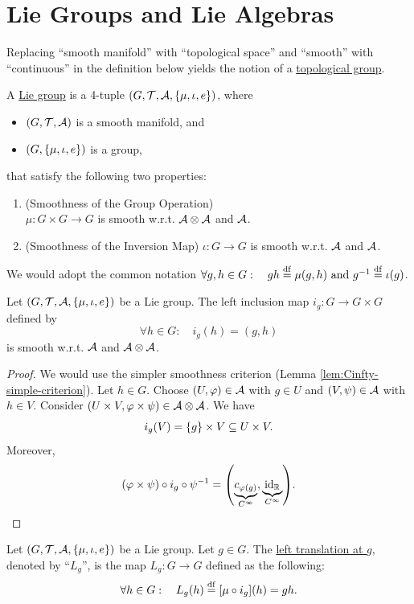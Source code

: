\documentclass[11pt,reqno]{amsart}
\renewcommand{\phi}{\varphi}
\begin{document}
\section{Lie Groups and Lie Algebras}
\begin{remark}
Replacing ``smooth manifold'' with ``topological space'' and ``smooth'' with ``continuous'' in the definition below yields the notion of a \ul{topological group}.
\end{remark}

\begin{Def}
A \ul{Lie group} is a 4-tuple $(G,\T,\A,\set{\mu,\iota,e})$, where
\begin{itemize}
\item $(G,\mathcal{T},\mathcal{A})$ is a smooth manifold, and
\item $(G,\set{\mu,\iota,e})$ is a group,
\end{itemize}
that satisfy the following two properties:
\begin{enumerate}
\item (Smoothness of the Group Operation)\\
$\mu:G\times G\to G$ is smooth w.r.t.
$\mathcal{A}\otimes\mathcal{A}$ and $\mathcal{A}$.
\item (Smoothness of the Inversion Map)
$\iota:G\to G$ is smooth w.r.t. $\mathcal{A}$ and $\mathcal{A}$.
\end{enumerate}
We would adopt the common notation $
\forall g,h\in G:\quad gh\stackrel{\mathrm{df}}{=}\mu(g,h)~\mathrm{and}~ g^{-1}\stackrel{\mathrm{df}}{=}\iota(g)$.
\end{Def}

\begin{lemma}\label{lem:left-inclusion-Cinfty}
Let $(G,\T,\A,\set{\mu,\iota,e})$ be a Lie group.
The left inclusion map $i_g:G\to G\times G$
defined by
\[\forall h\in G:\quad i_g(h)=(g,h)\]
is smooth w.r.t. $\mathcal{A}$ and $\mathcal{A}\otimes\mathcal{A}$.
\end{lemma}
\begin{proof}
We would use the simpler smoothness criterion (Lemma \ref{lem:Cinfty-simple-criterion}).
Let $h\in G$. Choose $(U,\phi)\in\A$ with $g\in U$ and $(V,\psi)\in\mathcal{A}$
with $h\in V$.
Consider $(U\times V,\phi\times\psi)\in\A\otimes\A$.
We have
\[i_g(V)=\set{g}\times V\subseteq U\times V.\]
Moreover,
\[(\phi\times\psi)\circ i_g\circ\psi\inv=\Br{
\underbrace{c_{\phi(g)}}_{C^\infty},\underbrace{\id_\R}_{C^\infty}}.\]
\end{proof}

\begin{Def}
Let $(G,\T,\A,\set{\mu,\iota,e})$ be a Lie group.
Let $g\in G$.
The \ul{left translation at $g$}, denoted by ``$L_g$'',
is the map $L_g:G\to G$ defined as the following:
\[\forall h\in G:\quad L_g(h)\df \FUNC{\mu\circ i_g}{h}= gh.\]
\end{Def}
\end{document}
